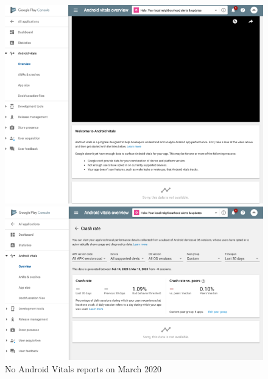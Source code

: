 \begin{figure}[htbp!]
\centering
\begin{minipage}{.45\textwidth}
  \centering
  \includegraphics[width=\textwidth]{images/localhalo/apphealthoverviewplace_5550596_no_data.png}
\end{minipage}\hfill%
\begin{minipage}{.45\textwidth}
  \centering
  \includegraphics[width=\textwidth]{images/localhalo/apphealthdetailsplace_55505963_no_data.png}
\end{minipage}
    \caption{No Android Vitals reports on  March 2020}
    \label{fig:localhalo-android-vitals-no-data-16-march-2020}
\end{figure}

